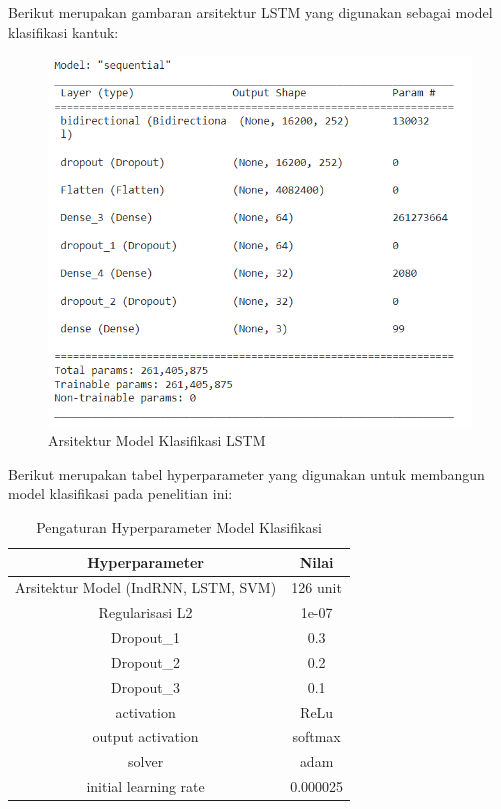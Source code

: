 Berikut merupakan gambaran arsitektur LSTM yang digunakan sebagai model
klasifikasi kantuk:
\begin{figure} [H] \centering
      \includegraphics[scale=0.7]{gambar/arsitekturLSTM.png}
      \caption{Arsitektur Model Klasifikasi LSTM}
      \label{fig:arsitekturLSTM}
\end{figure}

\newpage
Berikut merupakan tabel hyperparameter yang digunakan untuk membangun model klasifikasi pada penelitian ini:

\begin{longtable}{|c|c|}
      \caption{Pengaturan Hyperparameter Model Klasifikasi}
      \label{tb:Hyperparameter}                             \\
      \hline
      \rowcolor[HTML]{C0C0C0}
      \textbf{Hyperparameter}              & \textbf{Nilai} \\
      \hline
      Arsitektur Model (IndRNN, LSTM, SVM) & 126 unit       \\
      Regularisasi L2                      & 1e-07          \\
      Dropout\_1                           & 0.3            \\
      Dropout\_2                           & 0.2            \\
      Dropout\_3                           & 0.1            \\
      activation                           & ReLu           \\
      output activation                    & softmax        \\
      solver                               & adam           \\
      initial learning rate                & 0.000025       \\
      \hline
\end{longtable}


